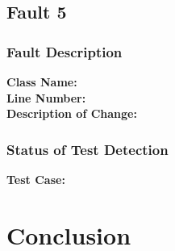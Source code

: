 \documentclass[letterpaper,10pt]{article}
\begin{document}
	\subsection{Fault 5}
		\subsubsection{Fault Description}
		\textbf{Class Name: } \\
		\textbf{Line Number: } \\
		\textbf{Description of Change: } \\
		\subsubsection{Status of Test Detection}
		\textbf{Test Case: } \\

\section{Conclusion}
\end{document}
